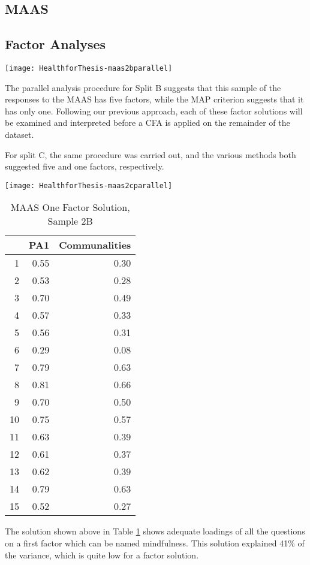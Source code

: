 \documentclass{article}
\begin{document}
\subsection{MAAS}
\label{sec:maas-samp-two}

\subsection{Factor Analyses}
\label{sec:fact-maas}

\texttt{[image: HealthforThesis-maas2bparallel]}

The parallel analysis procedure for Split B suggests that this sample of the responses to the MAAS has five factors, while the MAP criterion suggests that it has only one.  Following our previous approach, each of these factor solutions will be examined and interpreted before a CFA is applied on the remainder of the dataset.

For split C, the same procedure was carried out, and the various methods both suggested five and one factors, respectively. 

\texttt{[image: HealthforThesis-maas2cparallel]}



\begin{table}[ht]
\centering
\begin{tabular}{rrr}
  \hline
 & PA1 & Communalities \\ 
  \hline
1 & 0.55 & 0.30 \\ 
  2 & 0.53 & 0.28 \\ 
  3 & 0.70 & 0.49 \\ 
  4 & 0.57 & 0.33 \\ 
  5 & 0.56 & 0.31 \\ 
  6 & 0.29 & 0.08 \\ 
  7 & 0.79 & 0.63 \\ 
  8 & 0.81 & 0.66 \\ 
  9 & 0.70 & 0.50 \\ 
  10 & 0.75 & 0.57 \\ 
  11 & 0.63 & 0.39 \\ 
  12 & 0.61 & 0.37 \\ 
  13 & 0.62 & 0.39 \\ 
  14 & 0.79 & 0.63 \\ 
  15 & 0.52 & 0.27 \\ 
   \hline
\end{tabular}
\caption{MAAS One Factor Solution, Sample 2B} 
\label{tab:maas2bfact1}
\end{table}
The solution shown above in Table \ref{tab:maas2bfact1} shows adequate loadings of all the questions on a first factor which can be named mindfulness.  This solution explained 41\% of the variance, which is quite low for a factor solution.
\end{document}
